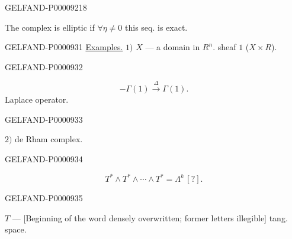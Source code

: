 \begin{GelfandAdjacentEvidence}{GELFAND-P000092}{18}

The complex is elliptic if $\forall\eta\ne0$ this seq. is exact.
\end{GelfandAdjacentEvidence}




\begin{GelfandAdjacentEvidence}{GELFAND-P000093}{1}
\underline{Examples.} $1)$ $X$ — a domain in $R^n$.
sheaf $1$ ($X\times R$).
\end{GelfandAdjacentEvidence}
\begin{GelfandAdjacentEvidence}{GELFAND-P000093}{2}

\begin{equation*}-\Gamma(1)\overset\Delta\longrightarrow\Gamma(1).\end{equation*}
Laplace operator.
\end{GelfandAdjacentEvidence}
\begin{GelfandAdjacentEvidence}{GELFAND-P000093}{3}

$2)$ de Rham complex.
\end{GelfandAdjacentEvidence}
\begin{GelfandAdjacentEvidence}{GELFAND-P000093}{4}

\begin{equation*}T^*\wedge T^*\wedge\cdots\wedge T^*=\Lambda^{k}\,[?].\end{equation*}
\end{GelfandAdjacentEvidence}
\begin{GelfandAdjacentEvidence}{GELFAND-P000093}{5}

$T$ —
[Beginning of the word densely overwritten; former letters illegible] tang. space.

\end{GelfandAdjacentEvidence}
